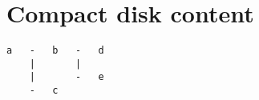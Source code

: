 \chapter{Compact disk content}
\begin{lstlisting}[columns=fixed,basicstyle=\ttfamily\footnotesize,tabsize=4]
a   -   b   -   d
    |       |
    |       -   e
    -   c
\end{lstlisting}
